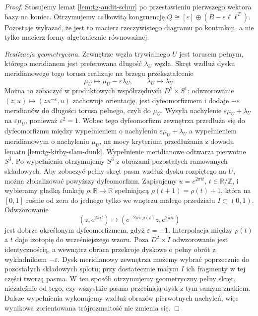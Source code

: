 \begin{proof}
Stosujemy lemat \ref{lem:tg-audit-schur} po
przestawieniu pierwszego wektora bazy na koniec.
Otrzymujemy całkowitą kongruencję
$Q\cong[\varepsilon]\oplus(B-\varepsilon\ell\ell^T)$.
Pozostaje wykazać, że jest to macierz rzeczywistego
diagramu po kontrakcji, a nie tylko macierz formy
algebraicznie równoważnej.

\emph{Realizacja geometryczna.}
Zewnętrze węzła trywialnego $U$ jest torusem
pełnym, którego meridianem jest preferowana
długość $\lambda_U$ węzła. Skręt wzdłuż dysku
meridianowego tego torusa realizuje na brzegu
przekształcenie
\[
\mu_U\longmapsto\mu_U-\varepsilon\lambda_U,
\qquad \lambda_U\longmapsto\lambda_U.
\]
Można to zobaczyć w produktowych współrzędnych
$D^2\times S^1$: odwzorowanie
$(z,u)\mapsto(zu^{-\varepsilon},u)$
zachowuje orientację, jest dyfeomorfizmem
i dodaje $-\varepsilon$ meridianów do długości
torusa pełnego, czyli do $\mu_U$.
Wysyła nachylenie $\varepsilon\mu_U+\lambda_U$
na $\varepsilon\mu_U$, ponieważ $\varepsilon^2=1$.
Wobec tego dyfeomorfizm zewnętrza przedłuża się
do dyfeomorfizmu między wypełnieniem o nachyleniu
$\varepsilon\mu_U+\lambda_U$ a wypełnieniem meridianowym
o nachyleniu $\mu_U$, na mocy kryterium przedłużania
z dowodu lematu \ref{lem:tg-kirby-slam-dunk}.
Wypełnienie meridianowe odtwarza pierwotne $S^3$.
Po wypełnieniu otrzymujemy $S^3$ z obrazami
pozostałych ramowanych składowych. Aby zobaczyć pełny skręt pasm wzdłuż dysku
rozpiętego na $U$, można zlokalizować powyższy
dyfeomorfizm. Zapisujemy $u=e^{2\pi it}$,
$t\in\mathbb R/\mathbb Z$, i wybieramy gładką
funkcję $\rho\colon\mathbb R\to\mathbb R$
spełniającą $\rho(t+1)=\rho(t)+1$, która na
$[0,1]$ rośnie od zera do jednego tylko we
wnętrzu małego przedziału $I\subset(0,1)$.
Odwzorowanie
\[
 (z,e^{2\pi it})\longmapsto
 (e^{-2\pi i\varepsilon\rho(t)}z,e^{2\pi it})
\]
jest dobrze określonym dyfeomorfizmem, gdyż
$\varepsilon=\pm1$. Interpolacja między $\rho(t)$
a $t$ daje izotopię do wcześniejszego wzoru.
Poza $D^2\times I$ odwzorowanie jest identycznością,
a wewnątrz obraca przekroje dyskowe o pełny obrót
z wykładnikiem $-\varepsilon$.
Dysk meridianowy zewnętrza możemy wybrać poprzecznie
do pozostałych składowych splotu; przy dostatecznie
małym $I$ ich fragmenty w tej części tworzą pasma.
W ten sposób otrzymujemy geometryczny pełny skręt,
niezależnie od tego, czy wszystkie pasma przecinają
dysk z tym samym znakiem.
Dalsze wypełnienia wykonujemy wzdłuż obrazów
pierwotnych nachyleń, więc wynikowa zorientowana
trójrozmaitość nie zmienia się.


\end{proof}

